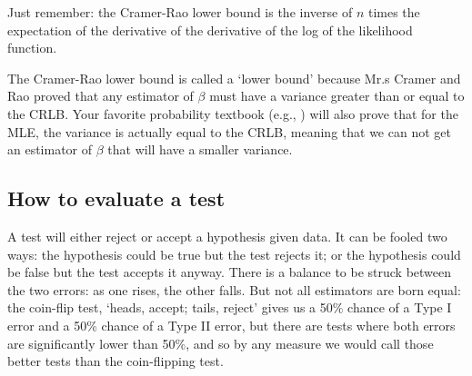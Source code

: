 Just remember: the Cramer-Rao lower bound is the inverse of $n$ times
the expectation of the derivative of the derivative of the log of the
likelihood function.

The Cramer-Rao lower bound is
called a `lower bound' because Mr.s Cramer and Rao proved that any
estimator of $\beta$ must have a variance greater than or equal to the
CRLB. Your favorite probability textbook (e.g., \cite{casella:berger})
will also prove that for the MLE, the variance is actually equal to the
CRLB, meaning that we can not get an estimator of $\beta$ that will
have a smaller variance.

\subsection{How to evaluate a test}



A test will either reject or accept a hypothesis given data. It can be
fooled two ways: the hypothesis could be true but the test rejects it;
or the hypothesis could be false but the test accepts it anyway. There
is a balance to be struck between the two errors: as one rises, the
other falls. But not all estimators are born equal: the coin-flip test, `heads, accept;
tails, reject' gives us a 50\% chance of a Type I error
and a 50\% chance of a Type II error, but there are tests where both
errors are significantly lower than 50\%, and so by any measure we would
call those better tests than the coin-flipping test. 

